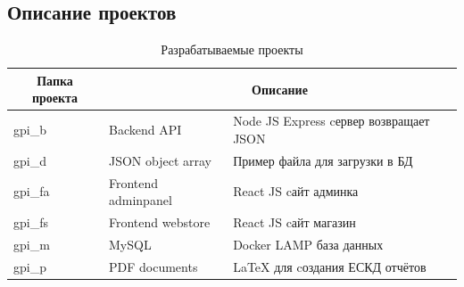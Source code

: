 \subsection{Описание проектов}

\begin{table}[!h]
    \centering
    \caption{Разрабатываемые проекты}
    \begin{tabular}{|p{4cm}|p{4cm}|p{8cm}|}

                                                                                           \hline
\multicolumn{1}{|c|}{\textbf{Папка проекта}}& \multicolumn{2}{c|}{\textbf{Описание}}    \\ \hline
gpi\_b  & Backend API           & Node JS Express cервер возвращает JSON                \\ \hline 
gpi\_d  & JSON object array     & Пример файла для загрузки в БД                        \\ \hline  
gpi\_fa & Frontend adminpanel   & React JS cайт админка                                 \\ \hline  
gpi\_fs & Frontend webstore     & React JS cайт магазин                                 \\ \hline
gpi\_m  & MySQL                 & Docker LAMP база данных                               \\ \hline
gpi\_p  & PDF documents         & LaTeX для cоздания ЕСКД отчётов                       \\ \hline

    \end{tabular}
\end{table}

\newpage
